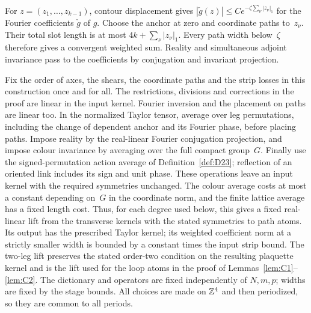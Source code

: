 For $z=(z_1,\ldots,z_{k-1})$, contour displacement gives $|\check g(z)|\le Ce^{-\zeta\sum_\nu|z_\nu|_1}$ for the Fourier coefficients $\check g$ of $g$. Choose the anchor at zero and coordinate paths to~$z_\nu$. Their total slot length is at most $4k+\sum_\nu|z_\nu|_1$. Every path width below~$\zeta$ therefore gives a convergent weighted sum. Reality and simultaneous adjoint invariance pass to the coefficients by conjugation and invariant projection.

Fix the order of axes, the shears, the coordinate paths and the strip losses in this construction once and for all. The restrictions, divisions and corrections in the proof are linear in the input kernel. Fourier inversion and the placement on paths are linear too. In the normalized Taylor tensor, average over leg permutations, including the change of dependent anchor and its Fourier phase, before placing paths. Impose reality by the real-linear Fourier conjugation projection, and impose colour invariance by averaging over the full compact group~$G$. Finally use the signed-permutation action average of Definition~\ref{def:D23}; reflection of an oriented link includes its sign and unit phase. These operations leave an input kernel with the required symmetries unchanged. The colour average costs at most a constant depending on~$G$ in the coordinate norm, and the finite lattice average has a fixed length cost. Thus, for each degree used below, this gives a fixed real-linear lift from the transverse kernels with the stated symmetries to path atoms. Its output has the prescribed Taylor kernel; its weighted coefficient norm at a strictly smaller width is bounded by a constant times the input strip bound. The two-leg lift preserves the stated order-two condition on the resulting plaquette kernel and is the lift used for the loop atoms in the proof of Lemmas~\ref{lem:C1}--\ref{lem:C2}. The dictionary and operators are fixed independently of $N,m,p$; widths are fixed by the stage bounds. All choices are made on $\mathbb{Z}^4$ and then periodized, so they are common to all periods.

